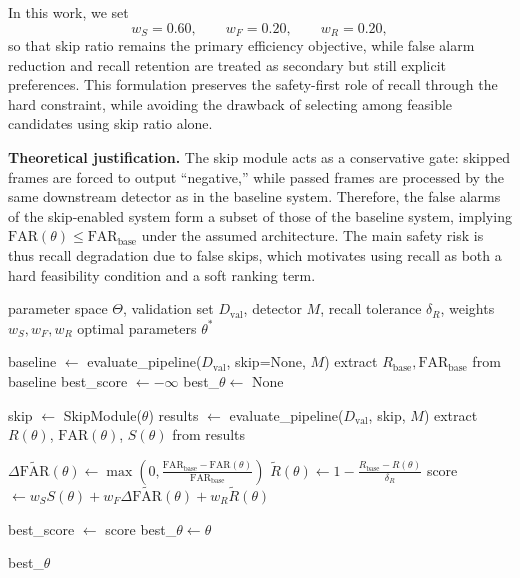 \documentclass{article}
\begin{document}
	In this work, we set
	\[
	w_S=0.60,\qquad
	w_F=0.20,\qquad
	w_R=0.20,
	\]
	so that skip ratio remains the primary efficiency objective, while false alarm reduction and recall retention are treated as secondary but still explicit preferences. This formulation preserves the safety-first role of recall through the hard constraint, while avoiding the drawback of selecting among feasible candidates using skip ratio alone.

	\textbf{Theoretical justification.}
	The skip module acts as a conservative gate: skipped frames are forced to output ``negative,'' while passed frames are processed by the same downstream detector as in the baseline system. Therefore, the false alarms of the skip-enabled system form a subset of those of the baseline system, implying $\mathrm{FAR}(\theta)\leq \mathrm{FAR}_{\text{base}}$ under the assumed architecture. The main safety risk is thus recall degradation due to false skips, which motivates using recall as both a hard feasibility condition and a soft ranking term.

	\begin{algorithm}[htbp]
		\caption{Skip Module Hyperparameter Selection}
		\begin{algorithmic}[1]
			\Require parameter space $\Theta$, validation set $D_{\text{val}}$, detector $M$, recall tolerance $\delta_R$, weights $w_S,w_F,w_R$
			\Ensure optimal parameters $\theta^*$

			\State baseline $\gets$ evaluate\_pipeline($D_{\text{val}}$, skip=None, $M$)
			\State extract $R_{\text{base}}, \mathrm{FAR}_{\text{base}}$ from baseline
			\State best\_score $\gets -\infty$
			\State best\_$\theta \gets$ None

			\For{$\theta \in \Theta$}
			\State skip $\gets$ SkipModule($\theta$)
			\State results $\gets$ evaluate\_pipeline($D_{\text{val}}$, skip, $M$)
			\State extract $R(\theta)$, $\mathrm{FAR}(\theta)$, $S(\theta)$ from results

			\State $\Delta \widetilde{\mathrm{FAR}}(\theta)\gets
			\max\left(0,\frac{\mathrm{FAR}_{\text{base}}-\mathrm{FAR}(\theta)}{\mathrm{FAR}_{\text{base}}}\right)$
			\State $\widetilde{R}(\theta)\gets
			1-\frac{R_{\text{base}}-R(\theta)}{\delta_R}$
			\State score $\gets
			w_S S(\theta)+w_F \Delta \widetilde{\mathrm{FAR}}(\theta)+w_R \widetilde{R}(\theta)$

			\State best\_score $\gets$ score
			\State best\_$\theta \gets \theta$
			\EndIf
			\EndIf
			\EndFor

			\State \Return best\_$\theta$
		\end{algorithmic}
	\end{algorithm}
\end{document}
